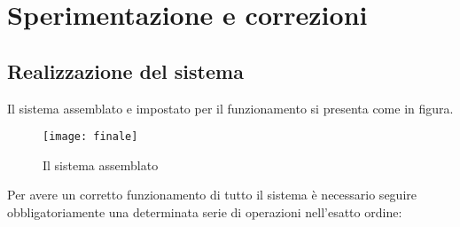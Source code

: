 \chapter{Sperimentazione e correzioni}
\label{sperimentazione}
\thispagestyle{empty}



\section{Realizzazione del sistema}
Il sistema assemblato e impostato per il funzionamento si presenta come in figura.
 \begin{figure}[htb]
    \centering
    \vspace{-0.7cm}
    \texttt{[image: finale]}
    \caption{Il sistema assemblato\label{fig:finale}}
\end{figure}
\newpage
\noindent Per avere un corretto funzionamento di tutto il sistema è necessario seguire obbligatoriamente una determinata serie di operazioni nell'esatto ordine:
